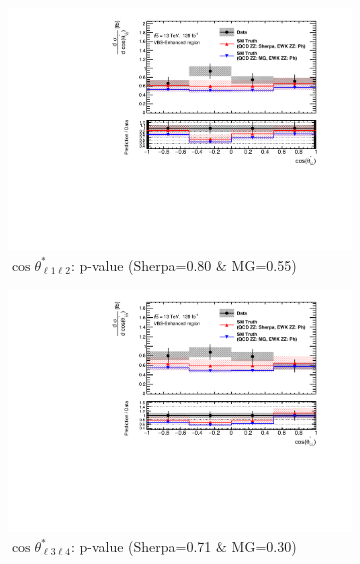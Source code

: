 \begin{figure}[!htb]
    \centering
    \begin{subfigure}{.49\textwidth}
        \centering
        \includegraphics[width=.98\linewidth]{figures/Results/CrossSection_VBSEnhanced/xs_cosThetaStar1_SR.pdf}
        \caption{ \footnotesize{$\cos \theta^{*}_{\ell 1 \ell 2}$: p-value (Sherpa=0.80 $\&$ MG=0.55)}}
    \end{subfigure}
    \begin{subfigure}{.49\textwidth}
        \centering
        \includegraphics[width=.98\linewidth]{figures/Results/CrossSection_VBSEnhanced/xs_cosThetaStar3_SR.pdf}
        \caption{ \footnotesize{$\cos \theta^{*}_{\ell 3 \ell 4}$: p-value (Sherpa=0.71 $\&$ MG=0.30)} }
    \end{subfigure}\\
    \begin{subfigure}{.49\textwidth}

\end{subfigure}
\end{figure}
